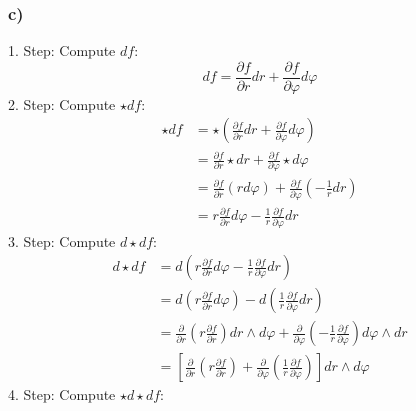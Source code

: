 \documentclass{article}
\begin{document}
\subsubsection*{c)}
1. Step: Compute $df$:
\begin{equation*}
	df = \frac{\partial f}{\partial r} dr + \frac{\partial f}{\partial \varphi} d\varphi
\end{equation*}
2. Step: Compute $\star df$:
\begin{align*}
	\star df &= \star \left(\frac{\partial f}{\partial r} dr + \frac{\partial f}{\partial \varphi} d\varphi\right)\\
	&= \frac{\partial f}{\partial r} \star dr + \frac{\partial f}{\partial \varphi} \star d\varphi\\
	&= \frac{\partial f}{\partial r} (r d\varphi) + \frac{\partial f}{\partial \varphi} \left(-\frac{1}{r} dr\right)\\
	&= r \frac{\partial f}{\partial r} d\varphi - \frac{1}{r} \frac{\partial f}{\partial \varphi} dr
\end{align*}
3. Step: Compute $d \star df$:
\begin{align*}
	d \star df &= d\left(r \frac{\partial f}{\partial r} d\varphi - \frac{1}{r} \frac{\partial f}{\partial \varphi} dr\right)\\
	&= d\left(r \frac{\partial f}{\partial r} d\varphi\right) - d\left(\frac{1}{r} \frac{\partial f}{\partial \varphi} dr\right)\\
	&= \frac{\partial}{\partial r}\left(r \frac{\partial f}{\partial r}\right) dr \wedge d\varphi + \frac{\partial}{\partial \varphi}\left(- \frac{1}{r} \frac{\partial f}{\partial \varphi}\right) d\varphi \wedge dr\\
	&= \left[\frac{\partial}{\partial r}\left(r \frac{\partial f}{\partial r}\right) + \frac{\partial}{\partial \varphi}\left(\frac{1}{r} \frac{\partial f}{\partial \varphi}\right)\right] dr \wedge d\varphi
\end{align*}
4. Step: Compute $\star d \star df$:
\end{document}
